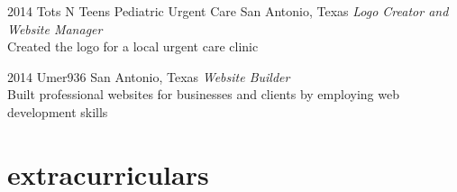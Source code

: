 \documentclass[]{friggeri-cv} %
\begin{document}
\begin{entrylist}

\entry
{2014}
{Tots N Teens Pediatric Urgent Care}
{San Antonio, Texas}
{\emph{Logo Creator and Website Manager} \\
	Created the logo for a local urgent care clinic}


\entry
{2014}
{Umer936}
{San Antonio, Texas}
{\emph{Website Builder} \\
	Built professional websites for businesses and clients by employing web development skills}

	
\end{entrylist}

\newpage  


\section{extracurriculars}
\end{document}
